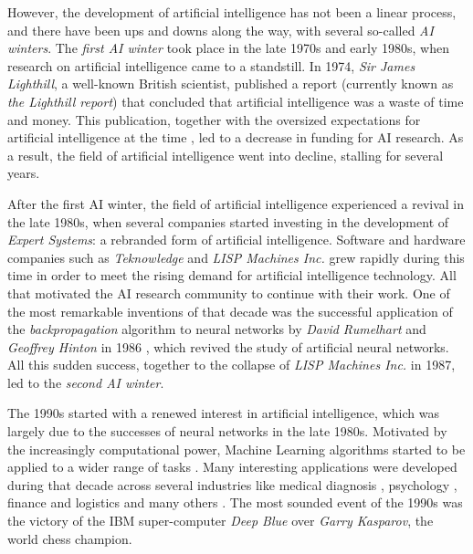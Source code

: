 However, the development of artificial intelligence has not been a linear process, and there have been ups and downs along the way, with several so-called \textit{AI winters}. The \textit{first AI winter} took place in the late 1970s and early 1980s, when research on artificial intelligence came to a standstill. In 1974, \textit{Sir James Lighthill}, a well-known British scientist, published a report \autocite{lighthillReport} (currently known as \textit{the Lighthill report}) that concluded that artificial intelligence was a waste of time and money. This publication, together with the oversized expectations for artificial intelligence at the time \autocite{russellNorvig}, led to a decrease in funding for AI research. As a result, the field of artificial intelligence went into decline, stalling for several years.

After the first AI winter, the field of artificial intelligence experienced a revival in the late 1980s, when several companies started investing in the development of \textit{Expert Systems}: a rebranded form of artificial intelligence. Software and hardware companies such as \textit{Teknowledge} and \textit{LISP Machines Inc.} grew rapidly during this time in order to meet the rising demand for artificial intelligence technology. All that motivated the AI research community to continue with their work. One of the most remarkable inventions of that decade was the successful application of the \textit{backpropagation} algorithm to neural networks by \textit{David Rumelhart} and \textit{Geoffrey Hinton} in 1986 \autocite{hinton1986}, which revived the study of artificial neural networks. All this sudden success, together to the collapse of \textit{LISP Machines Inc.} in 1987, led to the \textit{second AI winter}.

The 1990s started with a renewed interest in artificial intelligence, which was largely due to the successes of neural networks in the late 1980s. Motivated by the increasingly computational power, Machine Learning algorithms started to be applied to a wider range of tasks \autocite{Tesauro:1995}. Many interesting applications were developed during that decade across several industries like medical diagnosis \autocite{declaris1991, Klein1991, punch1992, Cinar1999}, psychology \autocite{Dorrer1995, denby1999, Ogawa1999, Perlovsky1999}, finance and logistics \autocite{Lipshutz1991, Benaroch1991, Johnson1991, Falas1994} and many others \autocite{Smithers1993, Yoo1994, Mashaly1994, Koyma1998}. The most sounded event of the 1990s was the victory of the IBM super-computer \textit{Deep Blue} \autocite{Campbell2002} over \textit{Garry Kasparov}, the world chess champion.


